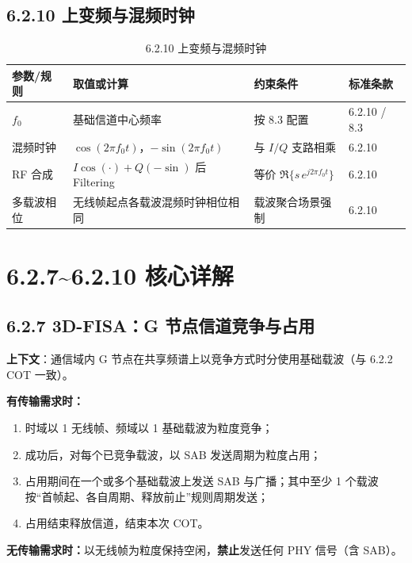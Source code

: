\documentclass[11pt,a4paper]{ctexart}
\begin{document}
\subsection{6.2.10 上变频与混频时钟}

\begin{longtable}{L{3.2cm}L{5cm}L{4.5cm}L{2cm}}
\caption{6.2.10 上变频与混频时钟\label{tab:6210-rf}} \\
\toprule
\textbf{参数/规则} & \textbf{取值或计算} & \textbf{约束条件} & \textbf{标准条款} \\
\midrule
$f_0$ & 基础信道中心频率 & 按 8.3 配置 & 6.2.10 / 8.3 \\
混频时钟 & $\cos(2\pi f_0 t)$，$-\sin(2\pi f_0 t)$ & 与 $I/Q$ 支路相乘 & 6.2.10 \\
RF 合成 & $I\cos(\cdot)+Q(-\sin)$ 后 Filtering & 等价 $\Re\{s\,e^{j2\pi f_0 t}\}$ & 6.2.10 \\
多载波相位 & 无线帧起点各载波混频时钟相位相同 & 载波聚合场景强制 & 6.2.10 \\
\bottomrule
\end{longtable}

\section{6.2.7\textasciitilde 6.2.10 核心详解}

\subsection{6.2.7 3D-FISA：G 节点信道竞争与占用}

\textbf{上下文}：通信域内 G 节点在共享频谱上以竞争方式时分使用基础载波（与 6.2.2 COT 一致）。

\textbf{有传输需求时：}
\begin{enumerate}[nosep]
  \item 时域以 1 无线帧、频域以 1 基础载波为粒度竞争；
  \item 成功后，对每个已竞争载波，以 SAB 发送周期为粒度占用；
  \item 占用期间在一个或多个基础载波上发送 SAB 与广播；其中至少 1 个载波按``首帧起、各自周期、释放前止''规则周期发送；
  \item 占用结束释放信道，结束本次 COT。
\end{enumerate}

\textbf{无传输需求时：}以无线帧为粒度保持空闲，\textbf{禁止}发送任何 PHY 信号（含 SAB）。
\end{document}
